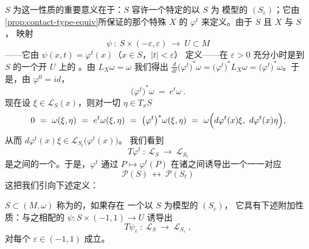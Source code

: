 $S$ 为\trContactType{}这一性质的重要意义在于：$S$ 容许一个特定的以 $S$ 为%
模型的\trParameterizedHypersurfaceFamily{} $(S_{\varepsilon})$；它由%
\cref{prop:contact-type-equiv}所保证的那个特殊\trVectorField{} $X$ 的\trFlow{}%
$\varphi^{t}$ 来定义。由于 $S$ \trCompact{}且 $X$ 与 $S$ \trTransversal，%
映射
\[
\psi\ :\ S\times(-\varepsilon,\varepsilon)\ \to\ U\subset M
\]
——它由 $\psi(x,t)=\varphi^{t}(x)$（$x\in S$，$\lvert t\rvert<\varepsilon$）%
定义——在 $\varepsilon>0$ 充分小时是到 $S$ 的一个开\trNeighborhood{} $U$ 上的%
\trDiffeomorphism。由 $L_{X}\omega=\omega$ 我们得出%
$\frac{d}{dt}\bigl(\varphi^{t}\bigr)^{*}\omega=\bigl(\varphi^{t}\bigr)^{*}%
L_{X}\omega=\bigl(\varphi^{t}\bigr)^{*}\omega$。于是，由 $\varphi^{0}=id$，
\[
\bigl(\varphi^{t}\bigr)^{*}\omega\ =\ e^{t}\omega\ .
\]
现在设 $\xi\in\mathcal{L}_{S}(x)$，则对一切 $\eta\in T_{x}S$
\[
0\ =\ \omega(\xi,\eta)\ =\ e^{t}\omega(\xi,\eta)\ =\ \bigl(\varphi^{t}\bigr)^{*}%
\omega(\xi,\eta)\ =\ \omega\Bigl(d\varphi^{t}(x)\xi,\ d\varphi^{t}(x)\eta\Bigr),
\]
从而 $d\varphi^{t}(x)\xi\in\mathcal{L}_{S_{t}}\bigl(\varphi^{t}(x)\bigr)$。%
我们看到
\[
T\varphi^{t}\ :\ \mathcal{L}_{S}\ \to\ \mathcal{L}_{S_{t}}
\]
是\trVectorBundle{}之间的一个\trIsomorphism。于是，$\varphi^{t}$ 通过%
$P\mapsto\varphi^{t}(P)$ 在诸\trClosedCharacteristic{}之间诱导出一个一一对应
\[
\mathcal{P}(S)\ \longleftrightarrow\ \mathcal{P}(S_{t})
\]
这把我们引向下述定义：

\begin{definition}\label{def:stable-hypersurface}
\trCompact\trHypersurface{} $S\subset(M,\omega)$ 称为\trStable{}的，如果存在%
一个以 $S$ 为模型的\trParameterizedHypersurfaceFamily{} $(S_{\varepsilon})$，%
它具有下述附加性质：与之相配的\trDiffeomorphism{} $\psi:S\times(-1,1)\to U$%
诱导出\trBundle\trIsomorphism
\[
T\psi_{\varepsilon}\ :\ \mathcal{L}_{S}\ \to\ \mathcal{L}_{S_{\varepsilon}}\ ,
\]
对每个 $\varepsilon\in(-1,1)$ 成立。
\end{definition}

